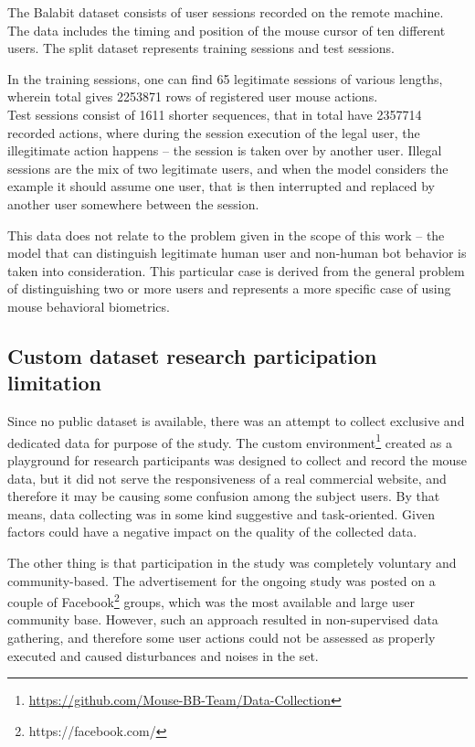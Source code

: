 The Balabit dataset consists of user sessions recorded on the remote machine.
The data includes the timing and position of the mouse cursor of ten different users.
The split dataset represents training sessions and test sessions.

In the training sessions, one can find \num{65} legitimate sessions of various lengths, wherein total gives \num{2253871} rows of registered user mouse actions.\\
Test sessions consist of \num{1611} shorter sequences, that in total have \num{2357714} recorded actions, where during the session execution of the legal user, the illegitimate action happens – the session is taken over by another user.
Illegal sessions are the mix of two legitimate users, and when the model considers the example it should assume one user, that is then interrupted and replaced by another user somewhere between the session.

This data does not relate to the problem given in the scope of this work – the model that can distinguish legitimate human user and non-human bot behavior is taken into consideration.
This particular case is derived from the general problem of distinguishing two or more users and represents a more specific case of using mouse behavioral biometrics.

\subsection{Custom dataset research participation limitation}\label{subsec:custom-dataset-research}
Since no public dataset is available, there was an attempt to collect exclusive and dedicated data for purpose of the study.
The custom environment\footnote{\url{https://github.com/Mouse-BB-Team/Data-Collection}} created as a playground for research participants was designed to collect and record the mouse data, but it did not serve the responsiveness of a real commercial website, and therefore it may be causing some confusion among the subject users.
By that means, data collecting was in some kind suggestive and task-oriented.
Given factors could have a negative impact on the quality of the collected data.

The other thing is that participation in the study was completely voluntary and community-based.
The advertisement for the ongoing study was posted on a couple of Facebook\footnote{https://facebook.com/} groups, which was the most available and large user community base.
However, such an approach resulted in non-supervised data gathering, and therefore some user actions could not be assessed as properly executed and caused disturbances and noises in the set.

